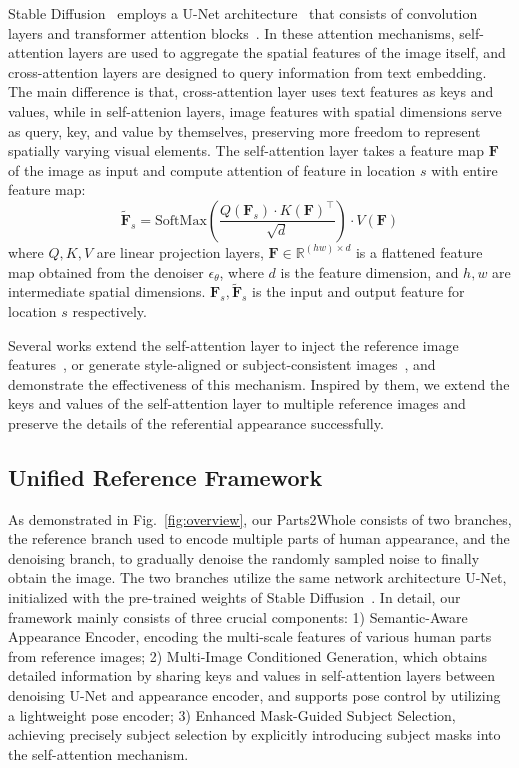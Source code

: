 Stable Diffusion~\cite{rombach2022ldm} employs a U-Net architecture~\cite{ronneberger2015unet} that consists of convolution layers and transformer attention blocks~\cite{vaswani2017attention}. In these attention mechanisms, self-attention layers are used to aggregate the spatial features of the image itself, and cross-attention layers are designed to query information from text embedding. The main difference is that, cross-attention layer uses text features as keys and values, while in self-attenion layers, image features with spatial dimensions serve as query, key, and value by themselves, preserving more freedom to represent spatially varying visual elements. The self-attention layer takes a feature map $\bm{F}$ of the image as input and compute attention of feature in location $s$ with entire feature map: 
\begin{equation}
    \tilde{\bm{F}}_{s} = \text{SoftMax}\left(
    \frac{
    Q(\bm{F}_s)\cdot K(\bm{F})^{\top}
    }{
    \sqrt{d}
    }\right)\cdot V(\bm{F})
    \label{eq:diff_self_attn}
\end{equation}
where $Q,K,V$ are linear projection layers, $\bm{F}\in \mathbb{R}^{(hw)\times d}$ is a flattened feature map obtained from the denoiser $\epsilon_{\theta}$, where $d$ is the feature dimension, and $h,w$ are intermediate spatial dimensions. $\bm{F}_s, \tilde{\bm{F}}_s$ is the input and output feature for location $s$ respectively.

Several works extend the self-attention layer to inject the reference image features~\cite{hu2023animateanyone,xu2023magicanimate}, or generate style-aligned or subject-consistent images~\cite{tewel2024consistory, hertz2023stylealigned, jeong2024visualstyleprompt}, and demonstrate the effectiveness of this mechanism. Inspired by them, we extend the keys and values of the self-attention layer to multiple reference images and preserve the details of the referential appearance successfully.

\subsection{Unified Reference Framework}
\label{subsec:unifiedref}

As demonstrated in Fig.~\ref{fig:overview}, our Parts2Whole consists of two branches, the reference branch used to encode multiple parts of human appearance, and the denoising branch, to gradually denoise the randomly sampled noise to finally obtain the image. The two branches utilize the same network architecture U-Net, initialized with the pre-trained weights of Stable Diffusion~\cite{rombach2022ldm}. In detail, our framework mainly consists of three crucial components: 1) Semantic-Aware Appearance Encoder, encoding the multi-scale features of various human parts from reference images; 2) Multi-Image Conditioned Generation, which obtains detailed information by sharing keys and values in self-attention layers between denoising U-Net and appearance encoder, and supports pose control by utilizing a lightweight pose encoder; 3) Enhanced Mask-Guided Subject Selection, achieving precisely subject selection by explicitly introducing subject masks into the self-attention mechanism.

